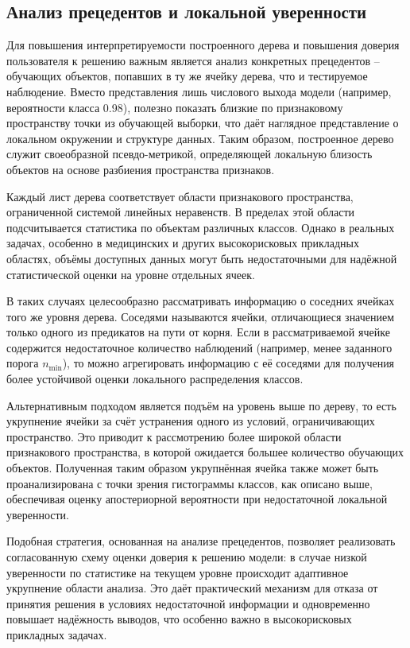 \subsection{Анализ прецедентов и локальной уверенности}

Для повышения интерпретируемости построенного дерева и повышения доверия пользователя к решению важным является анализ конкретных прецедентов -- обучающих объектов, попавших в ту же ячейку дерева, что и тестируемое наблюдение. Вместо представления лишь числового выхода модели (например, вероятности класса 0.98), полезно показать близкие по признаковому пространству точки из обучающей выборки, что даёт наглядное представление о локальном окружении и структуре данных. Таким образом, построенное дерево служит своеобразной псевдо-метрикой, определяющей локальную близость объектов на основе разбиения пространства признаков.

Каждый лист дерева соответствует области признакового пространства, ограниченной системой линейных неравенств. В пределах этой области подсчитывается статистика по объектам различных классов. Однако в реальных задачах, особенно в медицинских и других высокорисковых прикладных областях, объёмы доступных данных могут быть недостаточными для надёжной статистической оценки на уровне отдельных ячеек.

В таких случаях целесообразно рассматривать информацию о соседних ячейках того же уровня дерева. Соседями называются ячейки, отличающиеся значением только одного из предикатов на пути от корня. Если в рассматриваемой ячейке содержится недостаточное количество наблюдений (например, менее заданного порога \(n_\text{min}\)), то можно агрегировать информацию с её соседями для получения более устойчивой оценки локального распределения классов.

Альтернативным подходом является подъём на уровень выше по дереву, то есть укрупнение ячейки за счёт устранения одного из условий, ограничивающих пространство. Это приводит к рассмотрению более широкой области признакового пространства, в которой ожидается большее количество обучающих объектов. Полученная таким образом укрупнённая ячейка также может быть проанализирована с точки зрения гистограммы классов, как описано выше, обеспечивая оценку апостериорной вероятности при недостаточной локальной уверенности.

Подобная стратегия, основанная на анализе прецедентов, позволяет реализовать согласованную схему оценки доверия к решению модели: в случае низкой уверенности по статистике на текущем уровне происходит адаптивное укрупнение области анализа. Это даёт практический механизм для отказа от принятия решения в условиях недостаточной информации и одновременно повышает надёжность выводов, что особенно важно в высокорисковых прикладных задачах.
